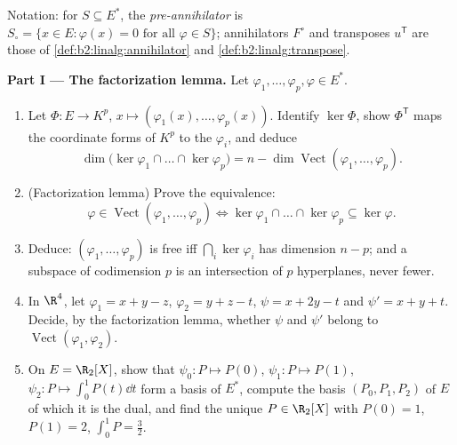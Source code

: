 \begin{problem}
\label{pb:b2:linalg:1}
Notation: for $S \subseteq E^*$, the \emph{pre-annihilator} is
$S_\circ = \{x \in E : \varphi(x) = 0 \text{ for all } \varphi
\in S\}$; annihilators $F^\circ$ and transposes $u^{\mathsf T}$
are those of \cref{def:b2:linalg:annihilator} and
\cref{def:b2:linalg:transpose}.

\medskip
\noindent\textbf{Part I --- The factorization lemma.} Let
$\varphi_1, \dots, \varphi_p, \varphi \in E^*$.
\begin{enumerate}
  \item Let $\Phi \colon E \to K^p$, $x \mapsto (\varphi_1(x),
        \dots, \varphi_p(x))$. Identify $\ker\Phi$, show
        $\Phi^{\mathsf T}$ maps the coordinate forms of $K^p$ to
        the $\varphi_i$, and deduce
        \[
        \dim \bigl(\ker\varphi_1 \cap \dots \cap
        \ker\varphi_p\bigr) = n - \dim
        \operatorname{Vect}(\varphi_1, \dots, \varphi_p).
        \]
  \item (Factorization lemma) Prove the equivalence:
        \[
        \varphi \in \operatorname{Vect}(\varphi_1, \dots,
        \varphi_p)
        \iff
        \ker\varphi_1 \cap \dots \cap \ker\varphi_p \subseteq
        \ker\varphi .
        \]
  \item Deduce: $(\varphi_1, \dots, \varphi_p)$ is free iff
        $\bigcap_i \ker\varphi_i$ has dimension $n - p$; and a
        subspace of codimension $p$ is an intersection of $p$
        hyperplanes, never fewer.
  \item In $\R^4$, let $\varphi_1 = x + y - z$, $\varphi_2 = y +
        z - t$, $\psi = x + 2y - t$ and $\psi' = x + y + t$.
        Decide, by the factorization lemma, whether $\psi$ and
        $\psi'$ belong to $\operatorname{Vect}(\varphi_1,
        \varphi_2)$.
  \item On $E = \R_2[X]$, show that $\psi_0 \colon P \mapsto
        P(0)$, $\psi_1 \colon P \mapsto P(1)$, $\psi_2 \colon P
        \mapsto \int_0^1 P(t)\dd t$ form a basis of $E^*$,
        compute the basis $(P_0, P_1, P_2)$ of $E$ of which it is
        the dual, and find the unique $P \in \R_2[X]$ with $P(0)
        = 1$, $P(1) = 2$, $\int_0^1 P = \frac32$.
\end{enumerate}


\end{problem}
